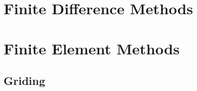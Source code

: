 \chapter{Finite Difference Methods}
\label{chapter:fdm}

\chapter{Finite Element Methods}
\label{chapter:fem}

\section{Griding}


\vfill
\eject








